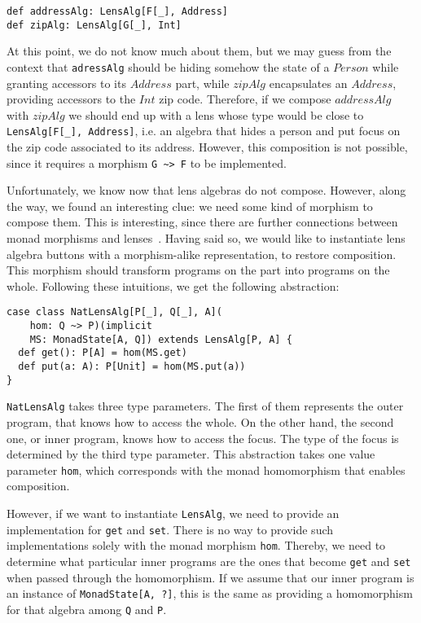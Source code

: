 \documentclass[final, twocolumn, 3p]{elsarticle}
\begin{document}
\begin{lstlisting}
def addressAlg: LensAlg[F[_], Address]
def zipAlg: LensAlg[G[_], Int]
\end{lstlisting}

At this point, we do not know much about them, but we may guess from the context
that \lstinline{adressAlg} should be hiding somehow the state of a $Person$
while granting accessors to its $Address$ part, while $zipAlg$ encapsulates an
$Address$, providing accessors to the $Int$ zip code. Therefore, if we compose
$addressAlg$ with $zipAlg$ we should end up with a lens whose type would be
close to \lstinline{LensAlg[F[_], Address]}, i.e. an algebra that hides a person
and put focus on the zip code associated to its address. However, this
composition is not possible, since it requires a morphism \lstinline{G ~> F} to
be implemented.

Unfortunately, we know now that lens algebras do not compose. However, along the
way, we found an interesting clue: we need some kind of morphism to compose
them. This is interesting, since there are further connections between monad
morphisms and lenses~\cite{abou2015notions}. Having said so, we would like to
instantiate lens algebra buttons with a morphism-alike representation, to
restore composition. This morphism should transform programs on the part into
programs on the whole. Following these intuitions, we get the following
abstraction:

\begin{lstlisting}
case class NatLensAlg[P[_], Q[_], A](
    hom: Q ~> P)(implicit
    MS: MonadState[A, Q]) extends LensAlg[P, A] {
  def get(): P[A] = hom(MS.get)
  def put(a: A): P[Unit] = hom(MS.put(a))
}
\end{lstlisting}

\lstinline{NatLensAlg} takes three type parameters. The first of them represents
the outer program, that knows how to access the whole. On the other hand, the
second one, or inner program, knows how to access the focus. The type of the
focus is determined by the third type parameter. This abstraction takes one
value parameter \lstinline{hom}, which corresponds with the monad homomorphism
that enables composition.

However, if we want to instantiate \lstinline{LensAlg}, we need to provide an
implementation for \lstinline{get} and \lstinline{set}. There is no way to
provide such implementations solely with the monad morphism \lstinline{hom}.
Thereby, we need to determine what particular inner programs are the ones that
become \lstinline{get} and \lstinline{set} when passed through the homomorphism.
If we assume that our inner program is an instance of \lstinline{MonadState[A, ?]},
this is the same as providing a homomorphism for that algebra among
\lstinline{Q} and \lstinline{P}.
\end{document}
